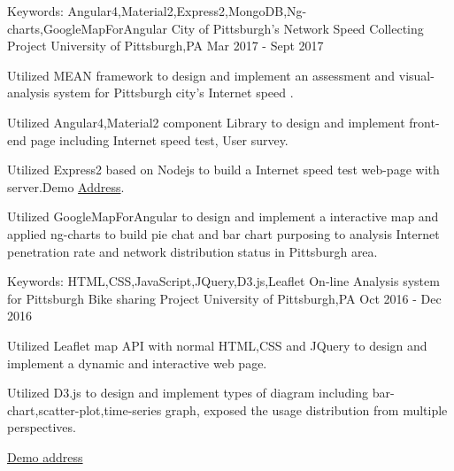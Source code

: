 \begin{cventries}
    \cventry
    {Keywords: Angular4,Material2,Express2,MongoDB,Ng-charts,GoogleMapForAngular} %
    {City of Pittsburgh's Network Speed Collecting Project} %
    {University of Pittsburgh,PA} %
    {Mar 2017 - Sept 2017}  %
    {
      \begin{cvitems}
      	\item {Utilized MEAN framework to design and implement an assessment and visual-analysis system for Pittsburgh city's Internet speed .}
		\item {Utilized Angular4,Material2 component Library to design and implement front-end page including Internet speed test, User survey.}
        \item {Utilized Express2 based on Nodejs to build a Internet speed test web-page with server.Demo \href{https://mysterious-cliffs-71051.herokuapp.com/}{Address}.}
        \item {Utilized GoogleMapForAngular to design and implement a interactive map and applied ng-charts to build pie chat and bar chart purposing to analysis Internet penetration rate and network distribution status in Pittsburgh area.}
      \end{cvitems}
    }
    
     \cventry
    {Keywords: HTML,CSS,JavaScript,JQuery,D3.js,Leaflet} %
    {On-line Analysis system for Pittsburgh Bike sharing Project} %
    {University of Pittsburgh,PA} %
    {Oct 2016 - Dec 2016}  %
    {
      \begin{cvitems}
      	\item {Utilized Leaflet map API with normal HTML,CSS and JQuery to design and implement a dynamic and interactive web page.}
		\item {Utilized D3.js to design and implement types of diagram including bar-chart,scatter-plot,time-series graph, exposed the usage distribution from multiple perspectives.}
        \item {\href{http://picso.org:8889/~classinfovis2016fall/projects/group-11/}{Demo address}}
      \end{cvitems}
    }
    

\end{cventries}
